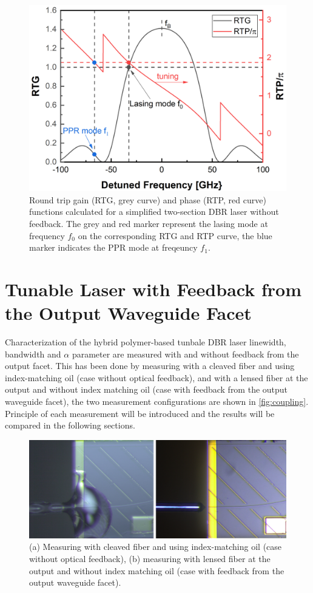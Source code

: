 \begin{figure}[ht]
    \centering
    \includegraphics[width=.7\linewidth]{figures/PP_resonance_operation_principle.png}
    \caption{Round trip gain (RTG, grey curve) and phase (RTP, red curve) functions calculated for a simplified two-section DBR laser without feedback. The grey and red marker represent the lasing mode at frequency $f_0$ on the corresponding RTG and RTP curve, the blue marker indicates the PPR mode at freqeuncy $f_1$.}
    \label{fig:PP_resonance_operation_principle}
\end{figure}

\chapter{Tunable Laser with Feedback from the Output Waveguide Facet}\label{ch:Laser_with_feedback_from_facet}
Characterization of the hybrid polymer-based tunbale DBR laser linewidth, bandwidth and $\alpha$ parameter are measured with and without feedback from the output facet. This has been done by measuring with a cleaved fiber and using index-matching oil (case without optical feedback), and with a lensed fiber at the output and without index matching oil (case with feedback from the output waveguide facet), the two measurement configurations are shown in \autoref{fig:coupling}. Principle of each measurement will be introduced and the results will be compared in the following sections.

\begin{figure}[ht]
    \centering
    \includegraphics[width=\linewidth]{figures/coupling.png}
    \caption{(a) Measuring with cleaved fiber and using index-matching oil (case without optical feedback), (b) measuring with lensed fiber at the output and without index matching oil (case with feedback from the output waveguide facet).}
    \label{fig:coupling}
\end{figure}

